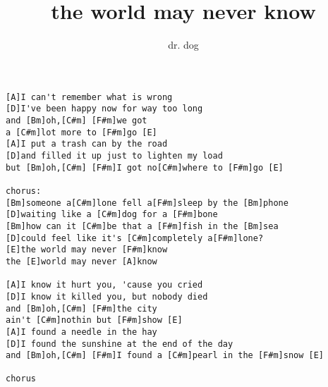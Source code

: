 \author{dr. dog}
\title{the world may never know}
\maketitle
\begin{verbatim}
[A]I can't remember what is wrong
[D]I've been happy now for way too long
and [Bm]oh,[C#m] [F#m]we got
a [C#m]lot more to [F#m]go [E]
[A]I put a trash can by the road
[D]and filled it up just to lighten my load
but [Bm]oh,[C#m] [F#m]I got no[C#m]where to [F#m]go [E]

chorus:
[Bm]someone a[C#m]lone fell a[F#m]sleep by the [Bm]phone
[D]waiting like a [C#m]dog for a [F#m]bone
[Bm]how can it [C#m]be that a [F#m]fish in the [Bm]sea
[D]could feel like it's [C#m]completely a[F#m]lone?
[E]the world may never [F#m]know
the [E]world may never [A]know

[A]I know it hurt you, 'cause you cried
[D]I know it killed you, but nobody died
and [Bm]oh,[C#m] [F#m]the city
ain't [C#m]nothin but [F#m]show [E]
[A]I found a needle in the hay
[D]I found the sunshine at the end of the day
and [Bm]oh,[C#m] [F#m]I found a [C#m]pearl in the [F#m]snow [E]

chorus
\end{verbatim}